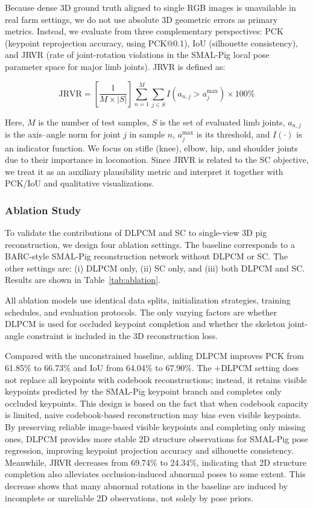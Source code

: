 \documentclass[computers,article,submit,pdftex,moreauthors]{mdpi}
\begin{document}
Because dense 3D ground truth aligned to single RGB images is unavailable in real farm settings, we do not use absolute 3D geometric errors as primary metrics. Instead, we evaluate from three complementary perspectives: PCK (keypoint reprojection accuracy, using PCK@0.1), IoU (silhouette consistency), and JRVR (rate of joint-rotation violations in the SMAL-Pig local pose parameter space for major limb joints). JRVR is defined as:

\begin{equation}
\text{JRVR} = \left[\frac{1}{M \times |S|}\right] \sum_{n=1}^{M} \sum_{j \in S} I(a_{n,j} > a_j^{\max}) \times 100\%
\end{equation}

Here, $M$ is the number of test samples, $S$ is the set of evaluated limb joints, $a_{n,j}$ is the axis--angle norm for joint $j$ in sample $n$, $a_j^{\max}$ is its threshold, and $I(\cdot)$ is an indicator function. We focus on stifle (knee), elbow, hip, and shoulder joints due to their importance in locomotion. Since JRVR is related to the SC objective, we treat it as an auxiliary plausibility metric and interpret it together with PCK/IoU and qualitative visualizations.

\subsubsection{Ablation Study}\label{sec:ablation}

To validate the contributions of DLPCM and SC to single-view 3D pig reconstruction, we design four ablation settings. The baseline corresponds to a BARC-style SMAL-Pig reconstruction network without DLPCM or SC. The other settings are: (i) DLPCM only, (ii) SC only, and (iii) both DLPCM and SC. Results are shown in Table~\ref{tab:ablation}.

All ablation models use identical data splits, initialization strategies, training schedules, and evaluation protocols. The only varying factors are whether DLPCM is used for occluded keypoint completion and whether the skeleton joint-angle constraint is included in the 3D reconstruction loss.

Compared with the unconstrained baseline, adding DLPCM improves PCK from 61.85\% to 66.73\% and IoU from 64.04\% to 67.90\%. The +DLPCM setting does not replace all keypoints with codebook reconstructions; instead, it retains visible keypoints predicted by the SMAL-Pig keypoint branch and completes only occluded keypoints. This design is based on the fact that when codebook capacity is limited, naive codebook-based reconstruction may bias even visible keypoints. By preserving reliable image-based visible keypoints and completing only missing ones, DLPCM provides more stable 2D structure observations for SMAL-Pig pose regression, improving keypoint projection accuracy and silhouette consistency. Meanwhile, JRVR decreases from 69.74\% to 24.34\%, indicating that 2D structure completion also alleviates occlusion-induced abnormal poses to some extent. This decrease shows that many abnormal rotations in the baseline are induced by incomplete or unreliable 2D observations, not solely by pose priors.
\end{document}
